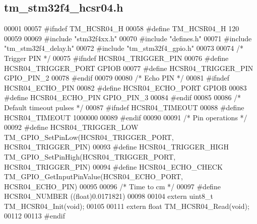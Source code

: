 \hypertarget{tm__stm32f4__hcsr04_8h_source}{}\subsection{tm\+\_\+stm32f4\+\_\+hcsr04.\+h}

\begin{DoxyCode}
00001 
00057 \textcolor{preprocessor}{#ifndef TM\_HCSR04\_H}
00058 \textcolor{preprocessor}{#define TM\_HCSR04\_H 120}
00059 
00069 \textcolor{preprocessor}{#include "stm32f4xx.h"}
00070 \textcolor{preprocessor}{#include "defines.h"}
00071 \textcolor{preprocessor}{#include "tm\_stm32f4\_delay.h"}
00072 \textcolor{preprocessor}{#include "tm\_stm32f4\_gpio.h"}
00073 
00074 \textcolor{comment}{/* Trigger PIN */}
00075 \textcolor{preprocessor}{#ifndef HCSR04\_TRIGGER\_PIN}
00076 \textcolor{preprocessor}{#define HCSR04\_TRIGGER\_PORT     GPIOB}
00077 \textcolor{preprocessor}{#define HCSR04\_TRIGGER\_PIN      GPIO\_PIN\_2}
00078 \textcolor{preprocessor}{#endif}
00079 
00080 \textcolor{comment}{/* Echo PIN */}
00081 \textcolor{preprocessor}{#ifndef HCSR04\_ECHO\_PIN}
00082 \textcolor{preprocessor}{#define HCSR04\_ECHO\_PORT        GPIOB}
00083 \textcolor{preprocessor}{#define HCSR04\_ECHO\_PIN         GPIO\_PIN\_3}
00084 \textcolor{preprocessor}{#endif}
00085 
00086 \textcolor{comment}{/* Default timeout pulses */}
00087 \textcolor{preprocessor}{#ifndef HCSR04\_TIMEOUT}
00088 \textcolor{preprocessor}{#define HCSR04\_TIMEOUT          1000000}
00089 \textcolor{preprocessor}{#endif}
00090 
00091 \textcolor{comment}{/* Pin operations */}
00092 \textcolor{preprocessor}{#define HCSR04\_TRIGGER\_LOW      TM\_GPIO\_SetPinLow(HCSR04\_TRIGGER\_PORT, HCSR04\_TRIGGER\_PIN)}
00093 \textcolor{preprocessor}{#define HCSR04\_TRIGGER\_HIGH     TM\_GPIO\_SetPinHigh(HCSR04\_TRIGGER\_PORT, HCSR04\_TRIGGER\_PIN)}
00094 \textcolor{preprocessor}{#define HCSR04\_ECHO\_CHECK       TM\_GPIO\_GetInputPinValue(HCSR04\_ECHO\_PORT, HCSR04\_ECHO\_PIN)}
00095 
00096 \textcolor{comment}{/* Time to cm */}
00097 \textcolor{preprocessor}{#define HCSR04\_NUMBER           ((float)0.0171821)}
00098 
00104 \textcolor{keyword}{extern} uint8\_t TM\_HCSR04\_Init(\textcolor{keywordtype}{void});
00105 
00111 \textcolor{keyword}{extern} \textcolor{keywordtype}{float} TM\_HCSR04\_Read(\textcolor{keywordtype}{void});
00112 
00113 \textcolor{preprocessor}{#endif}
\end{DoxyCode}
